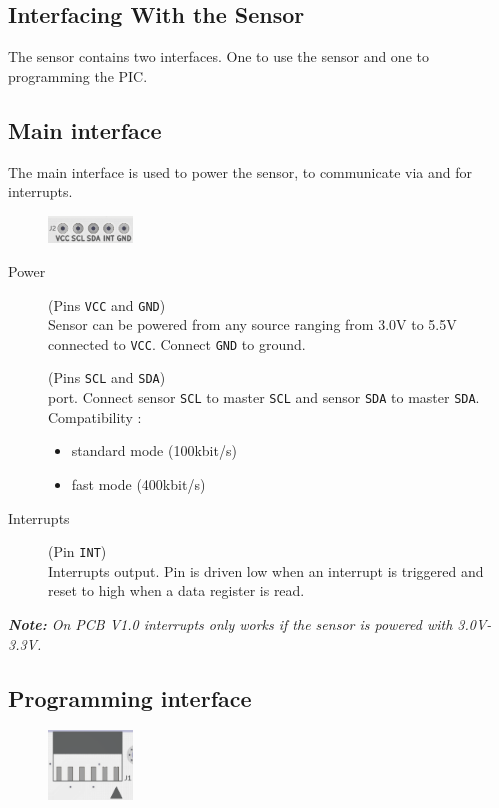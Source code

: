 \begin{multicols}{2}
\section{Interfacing With the Sensor}
The sensor contains two interfaces. One to use the sensor and one to programming the PIC.
\subsection{Main interface}
The main interface is used to power the sensor, to communicate via \iic and for interrupts.
\begin{figure}[H]
 \centering
 \includegraphics[width=0.2\textwidth]{../img/J2.png}
\end{figure}

\begin{description}
	\item[Power] (Pins \texttt{VCC} and \texttt{GND}) \\
	Sensor can be powered from any source ranging from 3.0V to 5.5V connected to \texttt{VCC}. Connect \texttt{GND} to ground. 
	
	\item[\iic] (Pins \texttt{SCL} and \texttt{SDA}) \\
	\iic port. Connect sensor \texttt{SCL} to master \texttt{SCL} and sensor \texttt{SDA} to master \texttt{SDA}.\\
	Compatibility : \cite{i2cspec} \cite{microchipDS}
	\begin{itemize}
		\item standard mode (100kbit/s)
		\item fast mode (400kbit/s)
	\end{itemize}
	
	\item[Interrupts] (Pin \texttt{INT}) \\
	Interrupts output. Pin is driven low when an interrupt is triggered and reset to high when a data register is read.
\end{description}
	\textit{\textbf{Note:} On PCB V1.0 interrupts only works if the sensor is powered with 3.0V-3.3V.}


\subsection{Programming interface}
\begin{figure}[H]
 \centering
 \includegraphics[width=0.2\textwidth]{../img/J1.png}
\end{figure}


\end{multicols}

